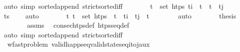 \begin{isabellebody}
\ {\isacharparenleft}{\kern0pt}auto\ simp{\isacharcolon}{\kern0pt}\ sorted{\isacharunderscore}{\kern0pt}append\ strict{\isacharunderscore}{\kern0pt}sorted{\isacharunderscore}{\kern0pt}iff{\isacharparenright}{\kern0pt}\isanewline
\ \ \ \ \isamarkupfalse%
\ \isamarkupfalse%
\ {\isachardoublequoteopen}{\isasymnot}{\isacharparenleft}{\kern0pt}{\isasymexists}t\ {\isasymin}\ set\ htps{\isachardot}{\kern0pt}\ t\isactrlsub i\ {\isacharless}{\kern0pt}\ t\ {\isasymand}\ t\ {\isacharless}{\kern0pt}\ t\isactrlsub j{\isacharparenright}{\kern0pt}{\isachardoublequoteclose}\isanewline
\ \ \ \ \ \ \isamarkupfalse%
\ {\isacartoucheopen}ts{\isacharprime}{\kern0pt}\ {\isacharequal}{\kern0pt}\ {\isacharbrackleft}{\kern0pt}{\isacharbrackright}{\kern0pt}{\isacartoucheclose}\ \isamarkupfalse%
\ auto\isanewline
\ \ \ \ \isamarkupfalse%
\ \isamarkupfalse%
\ {\isachardoublequoteopen}{\isasymforall}t{\isachardot}{\kern0pt}\ t\ {\isasymin}\ set\ htps\ {\isasymlongrightarrow}\ t\ {\isasymle}\ t\isactrlsub i\ {\isasymor}\ t\isactrlsub j\ {\isasymle}\ t{\isachardoublequoteclose}\isanewline
\ \ \ \ \ \ \isamarkupfalse%
\ auto\isanewline
\ \ \ \ \isamarkupfalse%
\ \isamarkupfalse%
\ {\isacharquery}{\kern0pt}thesis\isanewline
\ \ \ \ \ \ \isamarkupfalse%
\ assms\ \isamarkupfalse%
\ consec{\isacharunderscore}{\kern0pt}htps{\isacharunderscore}{\kern0pt}def\ htps{\isacharunderscore}{\kern0pt}seq{\isacharunderscore}{\kern0pt}def\ \isanewline
\ \ \ \ \ \ \isamarkupfalse%
\ {\isacharparenleft}{\kern0pt}auto\ simp{\isacharcolon}{\kern0pt}\ sorted{\isacharunderscore}{\kern0pt}append\ strict{\isacharunderscore}{\kern0pt}sorted{\isacharunderscore}{\kern0pt}iff{\isacharparenright}{\kern0pt}\isanewline
\ \ \isamarkupfalse%
%
\endisatagproof
{\isafoldproof}%
%
\isadelimproof
\isanewline
%
\endisadelimproof
\isanewline
\ \ \isamarkupfalse%
\ {\isacharparenleft}{\kern0pt}\ wf{\isacharunderscore}{\kern0pt}ast{\isacharunderscore}{\kern0pt}problem{\isacharparenright}{\kern0pt}\ valid{\isacharunderscore}{\kern0pt}happ{\isacharunderscore}{\kern0pt}seq{\isacharunderscore}{\kern0pt}valid{\isacharunderscore}{\kern0pt}state{\isacharunderscore}{\kern0pt}seq{\isacharunderscore}{\kern0pt}i{\isacharunderscore}{\kern0pt}to{\isacharunderscore}{\kern0pt}j{\isacharunderscore}{\kern0pt}aux{\isacharcolon}{\kern0pt}\isanewline

\end{isabellebody}

